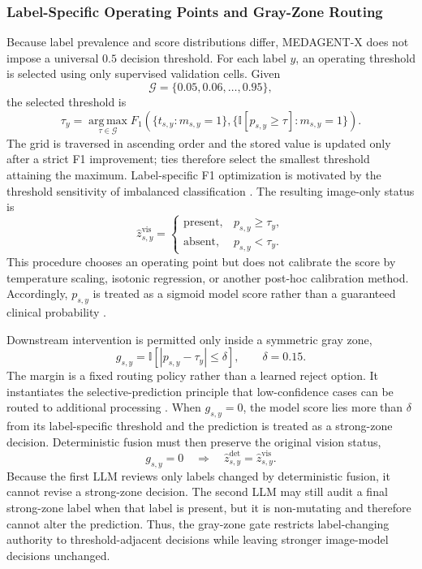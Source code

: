 \subsubsection{Label-Specific Operating Points and Gray-Zone Routing}

Because label prevalence and score distributions differ, MEDAGENT-X does not impose a universal $0.5$ decision threshold. For each label $y$, an operating threshold is selected using only supervised validation cells. Given
\[
\mathcal G=\{0.05,0.06,\ldots,0.95\},
\]
the selected threshold is
\[
\tau_y=\operatorname*{arg\,max}_{\tau\in\mathcal G}
F_1\!\left(
\{t_{s,y}:m_{s,y}=1\},
\{\mathbb I[p_{s,y}\geq\tau]:m_{s,y}=1\}
\right).
\]
The grid is traversed in ascending order and the stored value is updated only after a strict F1 improvement; ties therefore select the smallest threshold attaining the maximum. Label-specific F1 optimization is motivated by the threshold sensitivity of imbalanced classification \cite{lipton2014optimal}. The resulting image-only status is
\[
\widehat z^{\mathrm{vis}}_{s,y}=
\begin{cases}
\mathrm{present}, & p_{s,y}\geq\tau_y,\\
\mathrm{absent}, & p_{s,y}<\tau_y.
\end{cases}
\]
This procedure chooses an operating point but does not calibrate the score by temperature scaling, isotonic regression, or another post-hoc calibration method. Accordingly, $p_{s,y}$ is treated as a sigmoid model score rather than a guaranteed clinical probability \cite{guo2017calibration}.

Downstream intervention is permitted only inside a symmetric gray zone,
\[
g_{s,y}=\mathbb I\!\left[|p_{s,y}-\tau_y|\leq\delta\right],
\qquad \delta=0.15.
\]
The margin is a fixed routing policy rather than a learned reject option. It instantiates the selective-prediction principle that low-confidence cases can be routed to additional processing \cite{geifman2017selective,geifman2019selectivenet}. When $g_{s,y}=0$, the model score lies more than $\delta$ from its label-specific threshold and the prediction is treated as a strong-zone decision. Deterministic fusion must then preserve the original vision status,
\[
g_{s,y}=0
\quad\Longrightarrow\quad
\widehat z^{\mathrm{det}}_{s,y}=\widehat z^{\mathrm{vis}}_{s,y}.
\]
Because the first LLM reviews only labels changed by deterministic fusion, it cannot revise a strong-zone decision. The second LLM may still audit a final strong-zone label when that label is present, but it is non-mutating and therefore cannot alter the prediction. Thus, the gray-zone gate restricts label-changing authority to threshold-adjacent decisions while leaving stronger image-model decisions unchanged.

